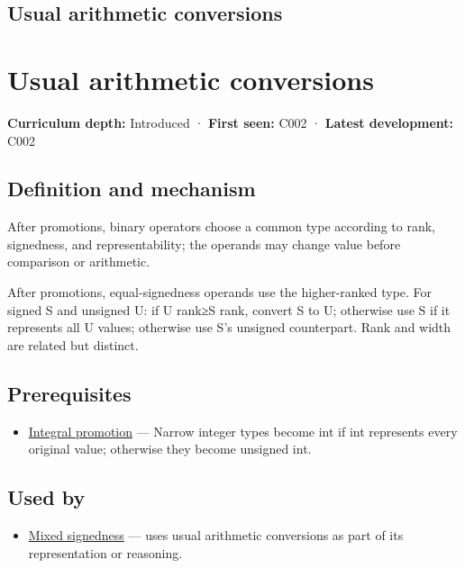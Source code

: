\hypertarget{appendix-5e2d663adf7f}{}
\section*{Usual arithmetic conversions}
\chapter{Usual arithmetic conversions}\label{appendix-5e2d663adf7f-usual-arithmetic-conversions}

\textbf{Curriculum depth:} Introduced · \textbf{First seen:} C002 · \textbf{Latest development:} C002

\section{Definition and mechanism}\label{appendix-5e2d663adf7f-definition-and-mechanism}

After promotions, binary operators choose a common type according to rank, signedness, and representability; the operands may change value before comparison or arithmetic.

After promotions, equal-signedness operands use the higher-ranked type. For signed S and unsigned U: if U rank≥S rank, convert S to U; otherwise use S if it represents all U values; otherwise use S's unsigned counterpart. Rank and width are related but distinct.

\section{Prerequisites}\label{appendix-5e2d663adf7f-prerequisites}

\begin{itemize}
\tightlist
\item
  \hyperref[appendix-45303d03796a]{Integral promotion} --- Narrow integer types become int if int represents every original value; otherwise they become unsigned int.
\end{itemize}

\section{Used by}\label{appendix-5e2d663adf7f-used-by}

\begin{itemize}
\tightlist
\item
  \hyperref[appendix-736a2345de4a]{Mixed signedness} --- uses usual arithmetic conversions as part of its representation or reasoning.
\end{itemize}


